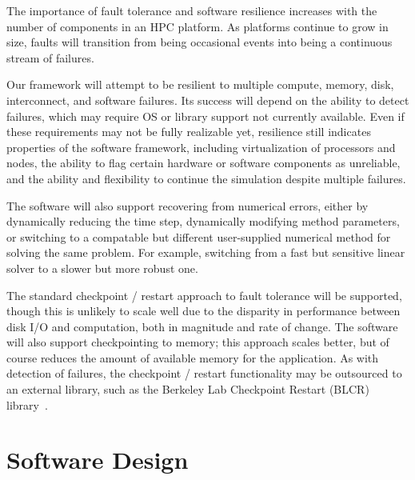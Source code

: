 \documentclass[10pt,twocolumn]{article}
\begin{document}
The importance of fault tolerance and software resilience increases
with the number of components in an HPC platform.  As platforms
continue to grow in size, faults will transition from being occasional
events into being a continuous stream of failures.

Our framework will attempt to be resilient to multiple compute,
memory, disk, interconnect, and software failures.  Its success will
depend on the ability to detect failures, which may require OS or
library support not currently available.  Even if these requirements
may not be fully realizable yet, resilience still indicates properties
of the software framework, including virtualization of processors and
nodes, the ability to flag certain hardware or software components as
unreliable, and the ability and flexibility to continue the simulation
despite multiple failures.

The software will also support recovering from numerical errors,
either by dynamically reducing the time step, dynamically modifying
method parameters, or switching to a compatable but different
user-supplied numerical method for solving the same problem.  For
example, switching from a fast but sensitive linear solver to a slower
but more robust one.

The standard checkpoint / restart approach to fault tolerance will be
supported, though this is unlikely to scale well due to the disparity
in performance between disk I/O and computation, both in magnitude and
rate of change.  The software will also support checkpointing to
memory; this approach scales better, but of course reduces the amount
of available memory for the application.  As with detection of
failures, the checkpoint / restart functionality may be outsourced to
an external library, such as the Berkeley Lab Checkpoint Restart
(BLCR) library~\cite{wwwblcr}.


\section{Software Design} \label{s:design}

\end{document}
